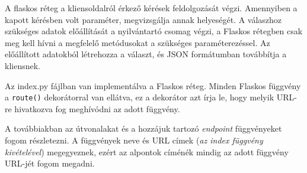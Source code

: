 A flaskos réteg a kliensoldalról érkező kérések feldolgozását végzi. Amennyiben a kapott kérésben volt paraméter, megvizsgálja annak helyeségét. A válaszhoz szükséges adatok előállítását a nyilvántartó csomag végzi, a Flaskos rétegben csak meg kell hívni a megfelelő metódusokat a szükséges paraméterezéssel. Az előállított adatokból létrehozza a választ, és JSON formátumban továbbítja a kliensnek.


Az index.py fájlban van implementálva a Flaskos réteg. Minden Flaskos függvény a \texttt{route()} dekorátorral van ellátva, ez a dekorátor azt írja le, hogy melyik URL-re hivatkozva fog meghívódni az adott függvény.

A továbbiakban az útvonalakat és a hozzájuk tartozó \textit{endpoint} függvényeket fogom részletezni.
A függvények neve és URL címek (\textit{az index függvény kivételével}) megegyeznek, ezért az alpontok címénék mindig az adott függvény URL-jét fogom megadni.

